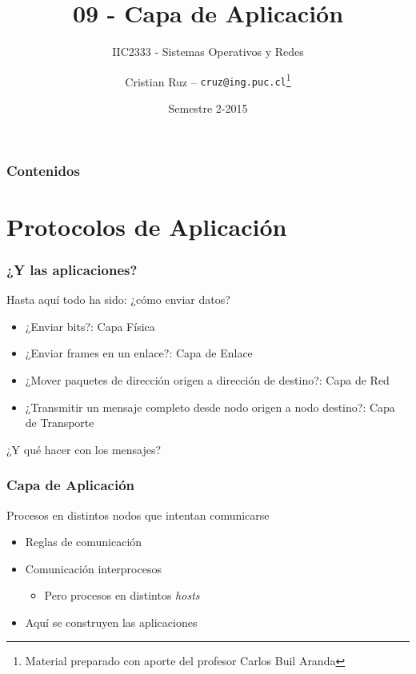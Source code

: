 \documentclass[letter]{beamer}
\title[IIC2333] %
{09 - Capa de Aplicación}
\subtitle{IIC2333 - Sistemas Operativos y Redes}
\author[C.Ruz] %
{Cristian Ruz -- {\tt cruz@ing.puc.cl}\footnote{Material preparado con aporte del profesor Carlos Buil Aranda} }
\institute[PUC] %
{
  Departamento de Ciencia de la Computación\\
  Pontificia Universidad Católica de Chile
}
\date[2/2015] %
{Semestre 2-2015}
\begin{document}
\frame{\titlepage}


\begin{frame}
\frametitle{Contenidos}
\tableofcontents
\end{frame}


\section{Protocolos de Aplicación}

\begin{frame}
  \frametitle{¿Y las aplicaciones?}
  
  Hasta aquí todo ha sido: ¿cómo enviar datos?
  \begin{itemize}
    \item ¿Enviar bits?: Capa Física
    \item ¿Enviar frames en un enlace?: Capa de Enlace
    \item ¿Mover paquetes de dirección origen a dirección de destino?: Capa de Red
    \item ¿Transmitir un mensaje completo desde nodo origen a nodo destino?: Capa de Transporte
  \end{itemize}
  ¿Y qué hacer con los mensajes? 
  
\end{frame}
\begin{frame}
  \frametitle{Capa de Aplicación}
  
  Procesos en distintos nodos que intentan comunicarse
  \begin{itemize}
    \item Reglas de comunicación
    \item Comunicación interprocesos
      \begin{itemize}
        \item Pero procesos en distintos {\em hosts}
      \end{itemize}
    \item Aquí se construyen las aplicaciones
  \end{itemize}

\end{frame}
\end{document}
